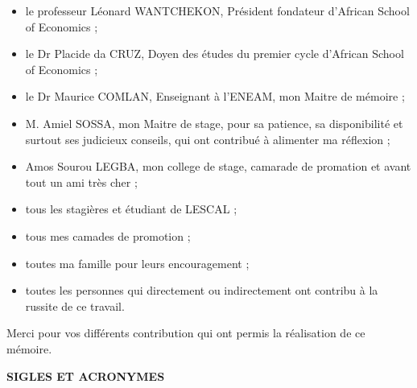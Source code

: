 \begin{itemize}
\item
  le professeur Léonard WANTCHEKON, Président fondateur d'African School
  of Economics ;\\
\item
  le Dr Placide da CRUZ, Doyen des études du premier cycle d'African
  School of Economics ;\\
\item
  le Dr Maurice COMLAN, Enseignant à l'ENEAM, mon Maitre de mémoire ;\\
\item
  M. Amiel SOSSA, mon Maitre de stage, pour sa patience, sa
  disponibilité et surtout ses judicieux conseils, qui ont contribué à
  alimenter ma réflexion ;\\
\item
  Amos Sourou LEGBA, mon college de stage, camarade de promation et
  avant tout un ami très cher ;\\
\item
  tous les stagières et étudiant de LESCAL ;\\
\item
  tous mes camades de promotion ;\\
\item
  toutes ma famille pour leurs encouragement ;\\
\item
  toutes les personnes qui directement ou indirectement ont contribu à
  la russite de ce travail.\\
\end{itemize}

Merci pour vos différents contribution qui ont permis la réalisation de
ce mémoire.

\textbf{SIGLES ET ACRONYMES}

